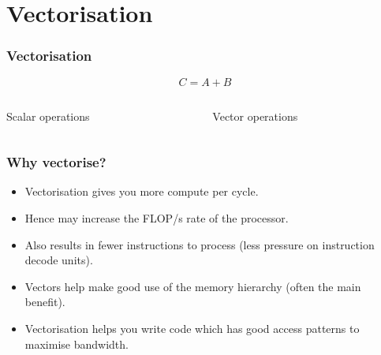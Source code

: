 \documentclass[aspectratio=169]{beamer}
\begin{document}
\section{Vectorisation}
\begin{frame}
\frametitle{Vectorisation}
$$C=A+B$$
\begin{columns}
\begin{column}{0.5\textwidth}
Scalar operations \\
\begin{adjustbox}{max totalsize={\textwidth}{0.6\textheight},center}

\end{adjustbox}
\end{column}

\begin{column}{0.5\textwidth}
Vector operations \\
\begin{adjustbox}{max totalsize={\textwidth}{0.6\textheight},center}
\end{adjustbox}
\end{column}
\end{columns}

\end{frame}

\begin{frame}
\frametitle{Why vectorise?}
\begin{itemize}
  \item Vectorisation gives you more compute per cycle.
  \item Hence may increase the FLOP/s rate of the processor.
  \item Also results in fewer instructions to process (less pressure on instruction decode units).
  \item Vectors help make good use of the memory hierarchy (often the main benefit).
  \item Vectorisation helps you write code which has good access patterns to maximise bandwidth.
\end{itemize}
\end{frame}
\end{document}
